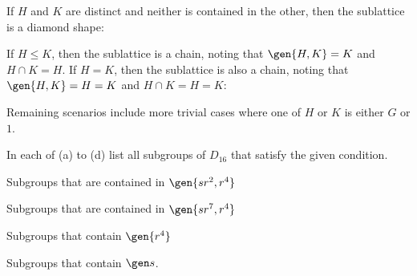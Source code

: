 \begin{sol}
    If $H$ and $K$ are distinct and neither is contained in the other, then the sublattice is a diamond shape:
    \begin{center}
    \end{center}
    If $H \leq K$, then the sublattice is a chain, noting that $\gen{H, K} = K$ and $H \cap K = H$. If $H = K$, then the sublattice is also a chain, noting that $\gen{H, K} = H = K$ and $H \cap K = H = K$:
    \begin{center}
    \end{center}
    Remaining scenarios include more trivial cases where one of $H$ or $K$ is either $G$ or $1$.
\end{sol}

\begin{exercise}\label{ex2.5.2}
    In each of (a) to (d) list all subgroups of $D_{16}$ that satisfy the given condition.
    \begin{subproblems}
        \item Subgroups that are contained in $\gen{sr^2, r^4}$
        \item Subgroups that are contained in $\gen{sr^7, r^4}$
        \item Subgroups that contain $\gen{r^4}$
        \item Subgroups that contain $\gen s$.
    \end{subproblems}
\end{exercise}

